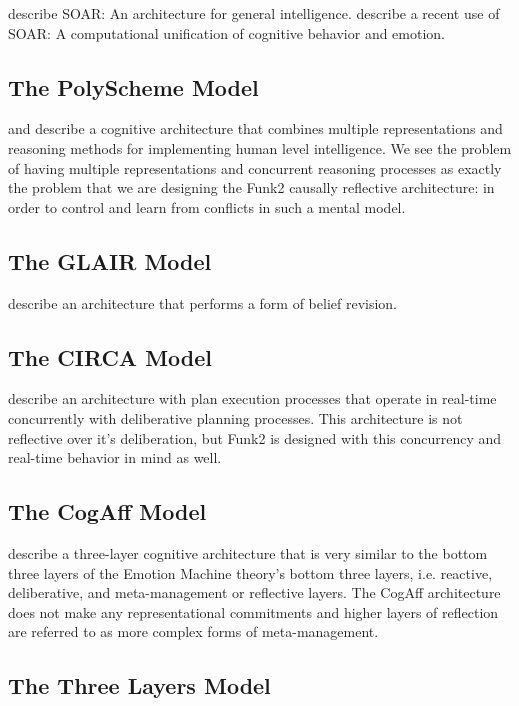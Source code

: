 \cite{laird1987sag} describe SOAR: An architecture for general intelligence.
\cite{marinier2009cuc} describe a recent use of SOAR: A computational unification of cognitive behavior and emotion.

\subsection{The PolyScheme Model}

\cite{cassimatis2004icp} and \cite{cassimatis2006csa} describe a cognitive architecture that combines multiple representations and reasoning methods for implementing human level intelligence.
We see the problem of having multiple representations and concurrent reasoning processes as exactly the problem that we are designing the Funk2 causally reflective architecture: in order to control and learn from conflicts in such a mental model.

\subsection{The GLAIR Model}

\cite{shapiro2003agl} describe an architecture that performs a form of belief revision.

\subsection{The CIRCA Model}

\cite{musliner2001irt} describe an architecture with plan execution processes that operate in real-time concurrently with deliberative planning processes.
This architecture is not reflective over it's deliberation, but Funk2 is designed with this concurrency and real-time behavior in mind as well.

\subsection{The CogAff Model}

\cite{sloman2001vaa} describe a three-layer cognitive architecture that is very similar to the bottom three layers of the Emotion Machine theory's bottom three layers, i.e. reactive, deliberative, and meta-management or reflective layers.
The CogAff architecture does not make any representational commitments and higher layers of reflection are referred to as more complex forms of meta-management.

\subsection{The Three Layers Model}

